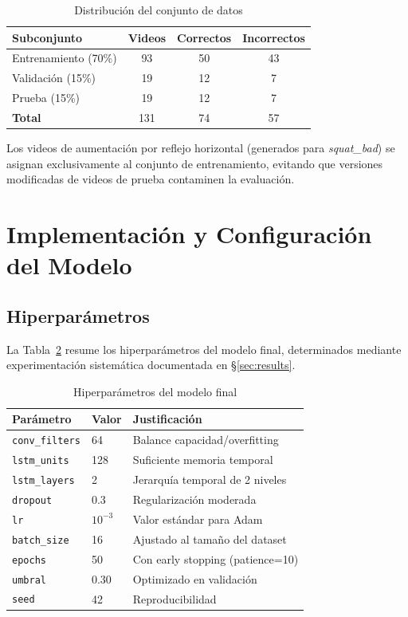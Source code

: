 \documentclass[conference]{IEEEtran}
\begin{document}
\begin{table}[h]
  \centering
  \caption{Distribución del conjunto de datos}
  \begin{tabular}{lccc}
    \hline
    \textbf{Subconjunto} & \textbf{Videos} & \textbf{Correctos} & \textbf{Incorrectos} \\
    \hline
    Entrenamiento (70\%) & 93  & 50 & 43 \\
    Validación (15\%)    & 19  & 12 & 7  \\
    Prueba (15\%)        & 19  & 12 & 7  \\
    \hline
    \textbf{Total}       & 131 & 74 & 57 \\
    \hline
  \end{tabular}
  \label{tab:split}
\end{table}

Los videos de aumentación por reflejo horizontal (generados
para \textit{squat\_bad}) se asignan exclusivamente al conjunto
de entrenamiento, evitando que versiones modificadas de videos
de prueba contaminen la evaluación.

\section{Implementación y Configuración del Modelo}
\label{sec:implementation}

\subsection{Hiperparámetros}

La Tabla~\ref{tab:hyperparams} resume los hiperparámetros
del modelo final, determinados mediante experimentación
sistemática documentada en §\ref{sec:results}.

\begin{table}[h]
  \centering
  \caption{Hiperparámetros del modelo final}
  \begin{tabular}{lll}
    \hline
    \textbf{Parámetro} & \textbf{Valor} & \textbf{Justificación} \\
    \hline
    \texttt{conv\_filters} & 64 & Balance capacidad/overfitting \\
    \texttt{lstm\_units}   & 128 & Suficiente memoria temporal \\
    \texttt{lstm\_layers}  & 2   & Jerarquía temporal de 2 niveles \\
    \texttt{dropout}       & 0.3 & Regularización moderada \\
    \texttt{lr}            & $10^{-3}$ & Valor estándar para Adam \\
    \texttt{batch\_size}   & 16  & Ajustado al tamaño del dataset \\
    \texttt{epochs}        & 50  & Con early stopping (patience=10) \\
    \texttt{umbral}        & 0.30 & Optimizado en validación \\
    \texttt{seed}          & 42  & Reproducibilidad \\
    \hline
  \end{tabular}
  \label{tab:hyperparams}
\end{table}
\end{document}
